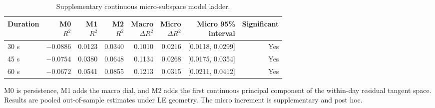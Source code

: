 
\begin{table}[!b]
\centering
\caption{Supplementary continuous micro-subspace model ladder.}
\label{tab:micro_subspace_pooled}
\scriptsize
\setlength{\tabcolsep}{2.4pt}
\begin{tabular}{lrrrrrrr}
\toprule
Duration & \shortstack{M0\\\(R^2\)} & \shortstack{M1\\\(R^2\)} &
\shortstack{M2\\\(R^2\)} & \shortstack{Macro\\\(\Delta R^2\)} &
\shortstack{Micro\\\(\Delta R^2\)} &
\shortstack{Micro 95\%\\interval} & Significant\\
\midrule
30 s & \(-0.0886\) & 0.0123 & 0.0340 & 0.1010 & 0.0216 & [0.0118, 0.0299] & Yes\\
45 s & \(-0.0754\) & 0.0380 & 0.0648 & 0.1134 & 0.0268 & [0.0175, 0.0354] & Yes\\
60 s & \(-0.0672\) & 0.0541 & 0.0855 & 0.1213 & 0.0315 & [0.0211, 0.0412] & Yes\\
\bottomrule
\end{tabular}
\begin{minipage}{0.94\linewidth}\footnotesize
M0 is persistence, M1 adds the macro dial, and M2 adds the first continuous
principal component of the within-day residual tangent space.  Results are
pooled out-of-sample estimates under LE geometry.  The micro increment is
supplementary and post hoc.
\end{minipage}
\end{table}
